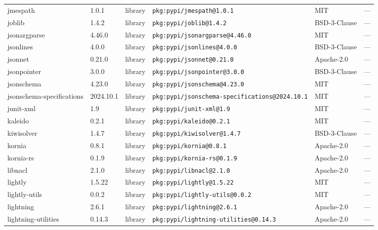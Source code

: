 \documentclass[11pt,a4paper]{article}
\begin{document}
\begin{longtable}{|p{4cm}|p{2cm}|p{1.6cm}|p{5cm}|p{1.5cm}|p{3.5cm}|}
\raggedright jmespath & 1.0.1 & library & \small\texttt{pkg:pypi/jmespath@1.0.1} & MIT & \small — \\
\raggedright joblib & 1.4.2 & library & \small\texttt{pkg:pypi/joblib@1.4.2} & BSD-3-Clause & \small — \\
\raggedright jsonargparse & 4.46.0 & library & \small\texttt{pkg:pypi/jsonargparse@4.46.0} & MIT & \small — \\
\raggedright jsonlines & 4.0.0 & library & \small\texttt{pkg:pypi/jsonlines@4.0.0} & BSD-3-Clause & \small — \\
\raggedright jsonnet & 0.21.0 & library & \small\texttt{pkg:pypi/jsonnet@0.21.0} & Apache-2.0 & \small — \\
\raggedright jsonpointer & 3.0.0 & library & \small\texttt{pkg:pypi/jsonpointer@3.0.0} & BSD-3-Clause & \small — \\
\raggedright jsonschema & 4.23.0 & library & \small\texttt{pkg:pypi/jsonschema@4.23.0} & MIT & \small — \\
\raggedright jsonschema-specifications & 2024.10.1 & library & \small\texttt{pkg:pypi/jsonschema-specifications@2024.10.1} & MIT & \small — \\
\raggedright junit-xml & 1.9 & library & \small\texttt{pkg:pypi/junit-xml@1.9} & MIT & \small — \\
\raggedright kaleido & 0.2.1 & library & \small\texttt{pkg:pypi/kaleido@0.2.1} & MIT & \small — \\
\raggedright kiwisolver & 1.4.7 & library & \small\texttt{pkg:pypi/kiwisolver@1.4.7} & BSD-3-Clause & \small — \\
\raggedright kornia & 0.8.1 & library & \small\texttt{pkg:pypi/kornia@0.8.1} & Apache-2.0 & \small — \\
\raggedright kornia-rs & 0.1.9 & library & \small\texttt{pkg:pypi/kornia-rs@0.1.9} & Apache-2.0 & \small — \\
\raggedright libnacl & 2.1.0 & library & \small\texttt{pkg:pypi/libnacl@2.1.0} & Apache-2.0 & \small — \\
\raggedright lightly & 1.5.22 & library & \small\texttt{pkg:pypi/lightly@1.5.22} & MIT & \small — \\
\raggedright lightly-utils & 0.0.2 & library & \small\texttt{pkg:pypi/lightly-utils@0.0.2} & MIT & \small — \\
\raggedright lightning & 2.6.1 & library & \small\texttt{pkg:pypi/lightning@2.6.1} & Apache-2.0 & \small — \\
\raggedright lightning-utilities & 0.14.3 & library & \small\texttt{pkg:pypi/lightning-utilities@0.14.3} & Apache-2.0 & \small — \\

\end{longtable}
\end{document}
